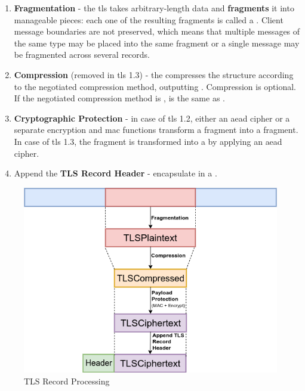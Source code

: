 \documentclass{llncs}
\begin{document}
\begin{enumerate}
  \item \textbf{Fragmentation} - the \gls{tls}  takes arbitrary-length data and \textbf{fragments}
  it into manageable pieces: each one of the resulting fragments is called a .
  Client message boundaries are not preserved, which means that multiple messages
  of the same type may be placed into the same fragment or a single message may
  be fragmented across several records.
  \item  \textbf{Compression} (removed in \gls{tls} 1.3) - the  compresses the
   structure according to the negotiated compression method,
  outputting . Compression is optional. If the negotiated compression
  method is ,  is the same as .
  \item \textbf{Cryptographic Protection} - in case of \gls{tls} 1.2, either an
  \gls{aead} cipher or a separate encryption and \gls{mac} functions transform a
   fragment into a  fragment. In case
  of \gls{tls} 1.3, the  fragment is transformed into a 
  by applying an \gls{aead} cipher.
  \item Append the \textbf{TLS Record Header} - encapsulate 
  in a .
\end{enumerate}

\begin{figure}
  \caption{\label{fig:tls-record-processing}TLS Record Processing}
  \centering
  \includegraphics[width=1.0\textwidth]{img/tls-record-processing-3.png}
\end{figure}
\end{document}
